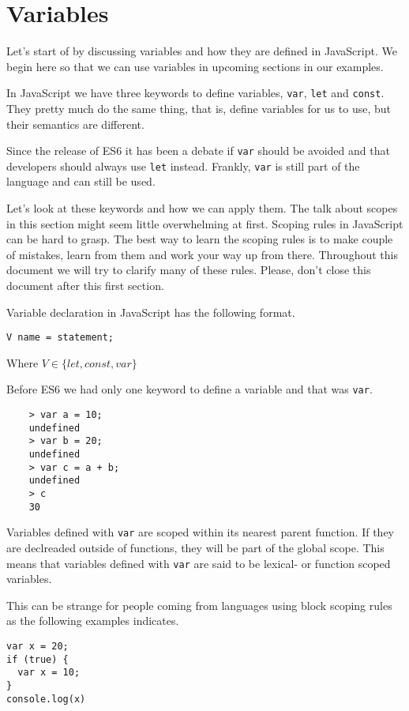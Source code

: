 \section{Variables}\label{sec:variables}
Let's start of by discussing variables and how they are defined in JavaScript. We begin here so that we can use variables in upcoming sections in our examples.

In JavaScript we have three keywords to define variables, \texttt{var}, \texttt{let} and \texttt{const}. They pretty much do the same thing, that is, define variables for us to use, but their semantics are different.

Since the release of ES6 it has been a debate if \texttt{var} should be avoided and that developers should always use \texttt{let} instead. Frankly, \texttt{var} is still part of the language and can still be used.

Let's look at these keywords and how we can apply them. The talk about scopes in this section might seem little overwhelming at first. Scoping rules in JavaScript can be hard to grasp. The best way to learn the scoping rules is to make couple of mistakes, learn from them and work your way up from there. Throughout this document we will try to clarify many of these rules. Please, don't close this document after this first section.


Variable declaration in JavaScript has the following format.

\begin{lstlisting}
V name = statement;
\end{lstlisting}
Where $V \in \{let, const, var\}$


Before ES6 we had only one keyword to define a variable and that was \texttt{var}.

\begin{lstlisting}
    > var a = 10;
    undefined
    > var b = 20;
    undefined
    > var c = a + b;
    undefined
    > c
    30
\end{lstlisting}

Variables defined with \texttt{var} are scoped within its nearest parent function. If they are declreaded outside of functions, they will be part of the global scope. This means that variables defined with \texttt{var} are said to be lexical- or function scoped variables.

This can be strange for people coming from languages using block scoping rules as the following examples indicates.

\begin{lstlisting}
var x = 20; 
if (true) {
  var x = 10; 
}
console.log(x)
\end{lstlisting}

